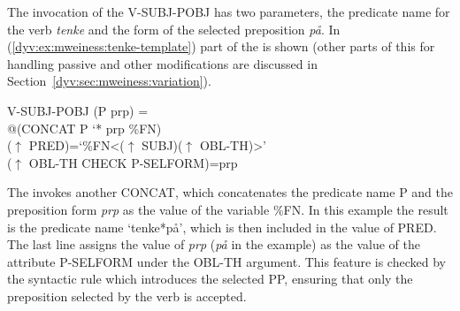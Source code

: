 \documentclass[output=paper]{langsci/langscibook}
\begin{document}
The invocation of the  V-SUBJ-POBJ has two parameters, the predicate name for the verb \textit{tenke} and the form of the selected preposition \textit{på}.
In (\ref{dyv:ex:mweiness:tenke-template}) part of the  is shown (other parts of this  for handling passive and other modifications are discussed in Section~\ref{dyv:sec:mweiness:variation}).

\ea\label{dyv:ex:mweiness:tenke-template}
{\small 
V-SUBJ-POBJ (P prp) =\\
\hspace{2em} @(CONCAT P `* prp \%FN)\\
\hspace{2em}  ($\uparrow$ PRED)=`\%FN<($\uparrow$ SUBJ)($\uparrow$ OBL-TH)>'\\
\hspace{2em}  ($\uparrow$ OBL-TH CHECK P-SELFORM)=prp
}
\z

The  invokes another  CONCAT, which concatenates the pre\-dicate name P and the preposition form \emph{prp} as the value of the variable \%FN.
In this example the result is the predicate name `tenke*på', which is then included in the value of PRED.
The last line assigns the value of \emph{prp} (\textit{på} in the example) as the value of the attribute P-SELFORM under the OBL-TH argument.
This feature is checked by the syntactic rule which introduces the selected PP, ensuring that only the preposition selected by the verb is accepted.



\end{document}
